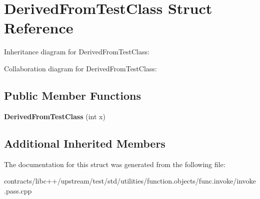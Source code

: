 \hypertarget{struct_derived_from_test_class}{}\section{Derived\+From\+Test\+Class Struct Reference}
\label{struct_derived_from_test_class}


Inheritance diagram for Derived\+From\+Test\+Class\+:


Collaboration diagram for Derived\+From\+Test\+Class\+:
\subsection*{Public Member Functions}
\begin{DoxyCompactItemize}
\item 
\mbox{\label{struct_derived_from_test_class_a47adc2a0db142e5f8aee7906f81d356d}} 
{\bfseries Derived\+From\+Test\+Class} (int x)
\end{DoxyCompactItemize}
\subsection*{Additional Inherited Members}


The documentation for this struct was generated from the following file\+:\begin{DoxyCompactItemize}
\item 
contracts/libc++/upstream/test/std/utilities/function.\+objects/func.\+invoke/invoke.\+pass.\+cpp\end{DoxyCompactItemize}
